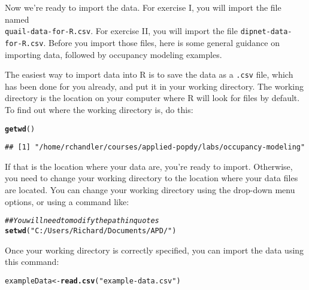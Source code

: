\documentclass[12pt]{article}\usepackage[]{graphicx}\usepackage[]{xcolor}
\makeatletter
\newcommand{\hlstr}[1]{\textcolor[rgb]{0.192,0.494,0.8}{#1}}%
\newcommand{\hlcom}[1]{\textcolor[rgb]{0.678,0.584,0.686}{\textit{#1}}}%
\newcommand{\hlstd}[1]{\textcolor[rgb]{0.345,0.345,0.345}{#1}}%
\newcommand{\hlkwb}[1]{\textcolor[rgb]{0.69,0.353,0.396}{#1}}%
\newcommand{\hlkwd}[1]{\textcolor[rgb]{0.737,0.353,0.396}{\textbf{#1}}}%
\newenvironment{kframe}{%
 \def\at@end@of@kframe{}%
 \ifinner\ifhmode%
  \def\at@end@of@kframe{\end{minipage}}%
  \begin{minipage}{\columnwidth}%
 \fi\fi%
 \def\FrameCommand##1{\hskip\@totalleftmargin \hskip-\fboxsep
 \colorbox{shadecolor}{##1}\hskip-\fboxsep
     \hskip-\linewidth \hskip-\@totalleftmargin \hskip\columnwidth}%
 \MakeFramed {\advance\hsize-\width
   \@totalleftmargin\z@ \linewidth\hsize
   \@setminipage}}%
 {\par\unskip\endMakeFramed%
 \at@end@of@kframe}
\newenvironment{knitrout}{}{} %
\makeatother
\begin{document}
Now we're ready to import the data. For exercise I, you will import
the file named \\ \texttt{quail-data-for-R.csv}. For exercise II, you
will import the file \texttt{dipnet-data-for-R.csv}. Before you import
those files, here is some general guidance on importing data, followed
by occupancy modeling examples.


The easiest way to import data into R is to save the data as a
\texttt{.csv} file, which has been done for you already, and put it in
your working directory. The working directory is the location on your
computer where R will look for files by default. To find out
where the working directory is, do this:  
    
\begin{knitrout}
\color{fgcolor}\begin{kframe}
\begin{alltt}
\hlkwd{getwd}\hlstd{()}
\end{alltt}
\begin{verbatim}
## [1] "/home/rchandler/courses/applied-popdy/labs/occupancy-modeling"
\end{verbatim}
\end{kframe}
\end{knitrout}

If that is the location where your data are, you're ready to
import. Otherwise, you need to change your working directory to the
location where your data files are located. You can change your
working directory using the drop-down menu options, or using a command
like:   

\begin{knitrout}
\color{fgcolor}\begin{kframe}
\begin{alltt}
\hlcom{## You will need to modify the path in quotes}
\hlkwd{setwd}\hlstd{(}\hlstr{"C:/Users/Richard/Documents/APD/"}\hlstd{)}
\end{alltt}
\end{kframe}
\end{knitrout}

Once your working directory is correctly specified, you can import the
data using this command: 

\begin{knitrout}
\color{fgcolor}\begin{kframe}
\begin{alltt}
\hlstd{exampleData} \hlkwb{<-} \hlkwd{read.csv}\hlstd{(}\hlstr{"example-data.csv"}\hlstd{)}
\end{alltt}
\end{kframe}
\end{knitrout}
\end{document}

